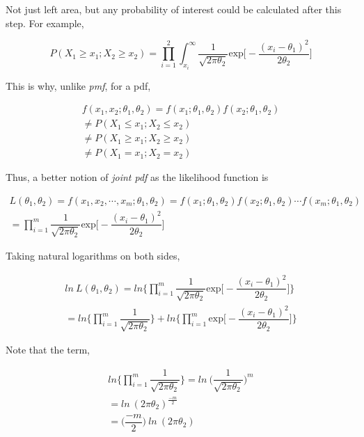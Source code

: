 \documentclass[float=false,crop=false]{standalone}
\begin{document}
Not just left area, but any probability of interest could be calculated
after this step. For example,

\[
P(X_1 \geq x_1; X_2 \geq x_2) = \prod\limits_{i=1}^{2} \int_{x_i}^{\infty} \dfrac{1}{\sqrt{2\pi\theta_2}}{\text{exp}}{\Big[ -\dfrac{  (x_i-\theta_1)^2 }{2\theta_2}}\Big] 
\]

This is why, unlike \emph{pmf}, for a pdf,

\[
\begin{aligned}
f(x_1,x_2;\theta_1,\theta_2) = f(x_1;\theta_1,\theta_2)f(x_2;\theta_1,\theta_2) \\ 
\neq P(X_1 \leq x_1; X_2 \leq x_2) \\
\neq P(X_1 \geq x_1; X_2 \geq x_2) \\
\neq P(X_1 = x_1; X_2 = x_2)
\end{aligned}
\]

    Thus, a better notion of \emph{joint pdf} as the likelihood function is

\[
\begin{aligned}
L(\theta_1,\theta_2) = f(x_1,x_2,\cdots,x_m;\theta_1,\theta_2) = f(x_1;\theta_1,\theta_2)f(x_2;\theta_1,\theta_2)\cdots f(x_m;\theta_1,\theta_2) \\
= \prod_{i=1}^{m} \dfrac{1}{\sqrt{2\pi\theta_2}}{\text{exp}}{\Big[ -\dfrac{  (x_i-\theta_1)^2 }{2\theta_2}  \Big]} 
\end{aligned}
\]

    Taking natural logarithms on both sides,

\begin{equation}
\begin{aligned}
ln \ L(\theta_1,\theta_2) = ln \Bigg\{  \prod_{i=1}^{m} \dfrac{1}{\sqrt{2\pi\theta_2}}{\text{exp}}{\Big[ -\dfrac{  (x_i-\theta_1)^2 }{2\theta_2}  \Big]}   \Bigg\} \\
= ln \Bigg\{  \prod_{i=1}^{m} \dfrac{1}{\sqrt{2\pi\theta_2}} \Bigg\} + 
ln \Bigg\{  \prod_{i=1}^{m} {\text{exp}}{\Big[ -\dfrac{  (x_i-\theta_1)^2 }{2\theta_2}  \Big]} \Bigg\} \label{eq:M011}
\end{aligned}
\end{equation}

    Note that the term,

\[
\begin{aligned}
ln \Bigg\{  \prod_{i=1}^{m} \dfrac{1}{\sqrt{2\pi\theta_2}} \Bigg\} 
= ln \ \Bigg( \dfrac{1}{\sqrt{2\pi\theta_2}} \Bigg)^m \\
= ln \ (2\pi\theta_2)^{\frac{-m}{2}} \\
= \bigg(\dfrac{-m}{2}\bigg) \ ln\ (2\pi\theta_2)
\end{aligned}
\]
\end{document}
